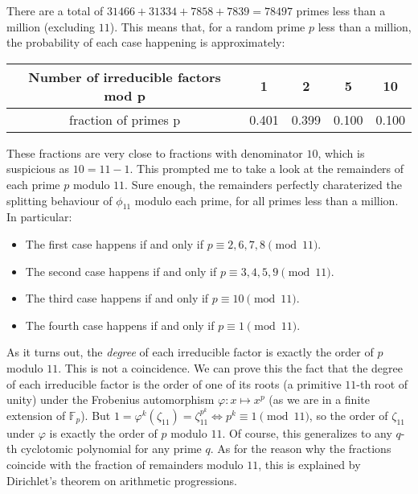 \documentclass[11pt]{article}
\theoremstyle{definition}
\begin{document}
    \noindent There are a total of $31466 + 31334 + 7858 + 7839 = 78497$ primes less than a million (excluding $11$). This means that,
    for a random prime $p$ less than a million, the probability of each case happening is approximately:

    \begin{center}
        \begin{tabular}{|c|c|c|c|c|}
            \hline
            Number of irreducible factors mod p & 1 & 2 & 5 & 10 \\
            \hline
            fraction of primes p & 0.401 & 0.399 & 0.100 & 0.100 \\
            \hline
        \end{tabular}
    \end{center}

    \noindent These fractions are very close to fractions with denominator $10$, which is suspicious as $10 = 11 - 1$.
    This prompted me to take a look at the remainders of each prime $p$ modulo $11$.
    Sure enough, the remainders perfectly charaterized the splitting behaviour of $\phi_{11}$ modulo each prime,
    for all primes less than a million.
    In particular: \pagebreak

    \begin{itemize}
        \item The first case happens if and only if $p \equiv 2, 6, 7, 8 \pmod{11}$.
        \item The second case happens if and only if $p \equiv 3, 4, 5, 9 \pmod{11}$.
        \item The third case happens if and only if $p \equiv 10 \pmod{11}$.
        \item The fourth case happens if and only if $p \equiv 1 \pmod{11}$.
    \end{itemize}

    \noindent As it turns out, the \emph{degree} of each irreducible factor is exactly the order of $p$ modulo $11$.
    This is not a coincidence.
    We can prove this the fact that the degree of each irreducible factor is the order of one of its roots (a primitive $11$-th root of unity)
    under the Frobenius automorphism $\varphi: x \mapsto x^p$
    (as we are in a finite extension of $\mathbb{F}_p$). But $1 = \varphi^{k}(\zeta_{11}) = \zeta_{11}^{p^k} \iff p^k \equiv 1 \pmod{11}$,
    so the order of $\zeta_{11}$ under $\varphi$ is exactly the order of $p$ modulo $11$.
    Of course, this generalizes to any $q$-th cyclotomic polynomial for any prime $q$.
    As for the reason why the fractions coincide with the fraction of remainders modulo $11$,
    this is explained by Dirichlet's theorem on arithmetic progressions.
\end{document}
